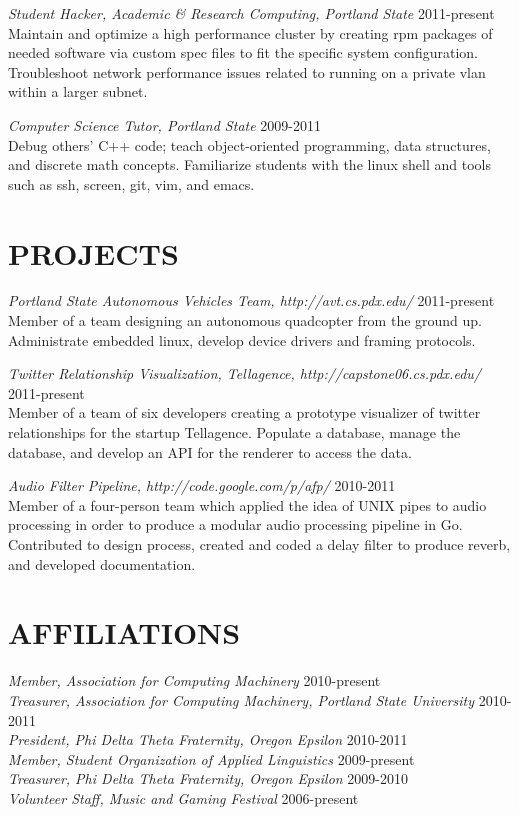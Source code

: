 \documentclass[overlapped]{res}
\begin{document}
\begin{resume}
{\sl Student Hacker, Academic \& Research Computing, Portland State} \hfill 2011-present\\
Maintain and optimize a high performance cluster by creating rpm packages of needed software via custom spec files to fit the specific system configuration. Troubleshoot network performance issues related to running on a private vlan within a larger subnet.

{\sl Computer Science Tutor, Portland State} \hfill 2009-2011\\
Debug others' C++ code; teach object-oriented programming, data structures, and discrete math concepts. Familiarize students with the linux shell and tools such as ssh, screen, git, vim, and emacs.

\section{PROJECTS} 
\vspace{7pt} 

{\sl Portland State Autonomous Vehicles Team, http://avt.cs.pdx.edu/} \hfill 2011-present\\
Member of a team designing an autonomous quadcopter from the ground up. Administrate embedded linux, develop device drivers and framing protocols.

{\sl Twitter Relationship Visualization, Tellagence, http://capstone06.cs.pdx.edu/} \hfill 2011-present\\
Member of a team of six developers creating a prototype visualizer of twitter relationships for the startup Tellagence. Populate a database, manage the database, and develop an API for the renderer to access the data.

{\sl Audio Filter Pipeline, http://code.google.com/p/afp/} \hfill 2010-2011\\
Member of a four-person team which applied the idea of UNIX pipes to audio processing in order to produce a modular audio processing pipeline in Go. Contributed to design process, created and coded a delay filter to produce reverb, and developed documentation.

\section{AFFILIATIONS}
\vspace{7pt} 

{\sl Member, Association for Computing Machinery} \hfill 2010-present\\
{\sl Treasurer, Association for Computing Machinery, Portland State University} \hfill 2010-2011\\
{\sl President, Phi Delta Theta Fraternity, Oregon Epsilon} \hfill 2010-2011\\
{\sl Member, Student Organization of Applied Linguistics} \hfill 2009-present\\
{\sl Treasurer, Phi Delta Theta Fraternity, Oregon Epsilon} \hfill 2009-2010\\
{\sl Volunteer Staff, Music and Gaming Festival} \hfill 2006-present\\


\end{resume}
\end{document}
